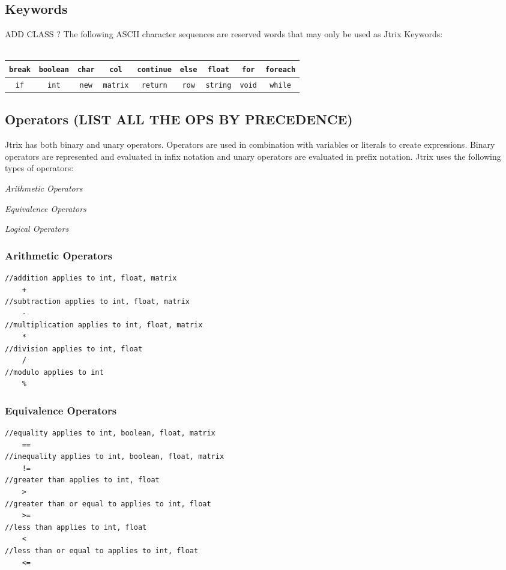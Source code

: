 \documentclass[12pt]{report}
\begin{document}
\subsection{Keywords}
ADD CLASS ?
The following ASCII character sequences are reserved words that may only be used as Jtrix Keywords:\\ \\
{\renewcommand{\arraystretch}{1.5}
\begin{tabular}{c|c|c|c|c|c|c|c|c}
	\color{blue}\texttt{break} & \color{blue}\texttt{boolean} & \color{blue}\texttt{char} & \color{blue}\texttt{col} & \color{blue}\texttt{continue} & \color{blue}\texttt{else} & \color{blue}\texttt{float} &	 \color{blue}\texttt{for} & \color{blue}\texttt{foreach} \\ \hline
	\color{blue}\texttt{if} & \color{blue}\texttt{int} & \color{blue}\texttt{new} & \color{blue}\texttt{matrix} & \color{blue}\texttt{return} & \color{blue}\texttt{row} & \color{blue}\texttt{string} & \color{blue}\texttt{void} & \color{blue}\texttt{while}
\end{tabular}

\subsection{Operators (LIST ALL THE OPS BY PRECEDENCE)}
Jtrix has both binary and unary operators. Operators are used in combination with variables or literals to create expressions. Binary operators are represented and evaluated in infix notation and unary operators are evaluated in prefix notation. Jtrix uses the following types of operators:

 \textit{Arithmetic Operators}

 \textit{Equivalence Operators}

 \textit{Logical Operators}

\subsubsection{Arithmetic Operators}
\begin{lstlisting}
//addition applies to int, float, matrix
	+
//subtraction applies to int, float, matrix
	-
//multiplication applies to int, float, matrix
	*
//division applies to int, float
	/
//modulo applies to int
	%
\end{lstlisting}
\subsubsection{Equivalence Operators}
\begin{lstlisting}
//equality applies to int, boolean, float, matrix
	==
//inequality applies to int, boolean, float, matrix
	!=
//greater than applies to int, float
	>
//greater than or equal to applies to int, float
	>=
//less than applies to int, float
	<
//less than or equal to applies to int, float
	<=
\end{lstlisting}

}
\end{document}
